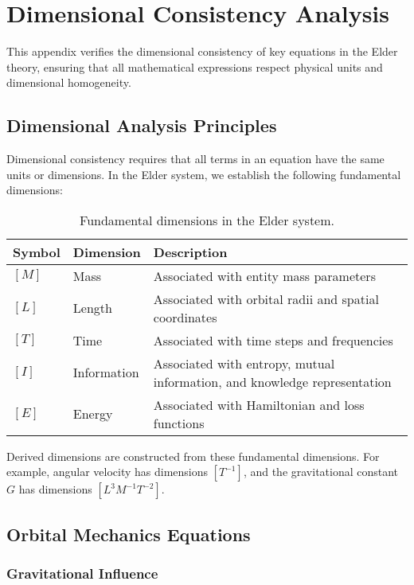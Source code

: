 \chapter{Dimensional Consistency Analysis}

This appendix verifies the dimensional consistency of key equations in the Elder theory, ensuring that all mathematical expressions respect physical units and dimensional homogeneity.

\section{Dimensional Analysis Principles}

Dimensional consistency requires that all terms in an equation have the same units or dimensions. In the Elder system, we establish the following fundamental dimensions:

\begin{table}[h]
\centering
\begin{tabular}{|l|l|p{8cm}|}
\hline
\textbf{Symbol} & \textbf{Dimension} & \textbf{Description} \\
\hline
$[M]$ & Mass & Associated with entity mass parameters \\
\hline
$[L]$ & Length & Associated with orbital radii and spatial coordinates \\
\hline
$[T]$ & Time & Associated with time steps and frequencies \\
\hline
$[I]$ & Information & Associated with entropy, mutual information, and knowledge representation \\
\hline
$[E]$ & Energy & Associated with Hamiltonian and loss functions \\
\hline
\end{tabular}
\caption{Fundamental dimensions in the Elder system.}
\label{tab:fundamental_dimensions}
\end{table}

Derived dimensions are constructed from these fundamental dimensions. For example, angular velocity has dimensions $[T^{-1}]$, and the gravitational constant $G$ has dimensions $[L^3 M^{-1} T^{-2}]$.

\section{Orbital Mechanics Equations}

\subsection{Gravitational Influence}

